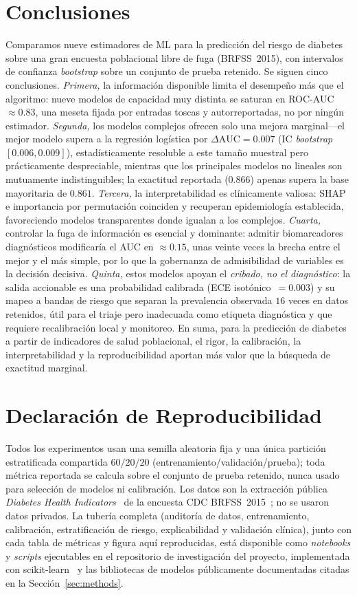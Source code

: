 \documentclass[conference]{IEEEtran}
\begin{document}
\section{Conclusiones}
Comparamos nueve estimadores de ML para la predicción del riesgo de
diabetes sobre una gran encuesta poblacional libre de fuga (BRFSS~2015), con intervalos de
confianza \emph{bootstrap} sobre un conjunto de prueba retenido. Se siguen cinco
conclusiones. \emph{Primera,} la información disponible limita el desempeño más que el
algoritmo: nueve modelos de capacidad muy distinta se saturan en ROC-AUC~$\approx0.83$, una
meseta fijada por entradas toscas y autorreportadas, no por ningún estimador. \emph{Segunda,}
los modelos complejos ofrecen solo una mejora marginal---el mejor modelo supera a la
regresión logística por $\Delta\text{AUC}=0.007$ (IC \emph{bootstrap} $[0.006,0.009]$),
estadísticamente resoluble a este tamaño muestral pero prácticamente despreciable, mientras
que los principales modelos no lineales son mutuamente indistinguibles; la exactitud
reportada ($0.866$) apenas supera la base mayoritaria de $0.861$. \emph{Tercera,} la
interpretabilidad es clínicamente valiosa: SHAP e importancia por permutación coinciden y
recuperan epidemiología establecida, favoreciendo modelos transparentes donde igualan a los
complejos. \emph{Cuarta,} controlar la fuga de información es esencial y dominante: admitir
biomarcadores diagnósticos modificaría el AUC en $\approx0.15$, unas veinte veces la brecha
entre el mejor y el más simple, por lo que la gobernanza de admisibilidad de variables es la
decisión decisiva. \emph{Quinta,} estos modelos apoyan el \emph{cribado, no el diagnóstico}:
la salida accionable es una probabilidad calibrada (ECE isotónico~$=0.003$) y su mapeo a
bandas de riesgo que separan la prevalencia observada $16$ veces en datos retenidos, útil
para el triaje pero inadecuada como etiqueta diagnóstica y que requiere recalibración local y
monitoreo. En suma, para la predicción de diabetes a partir de indicadores de salud
poblacional, el rigor, la calibración, la interpretabilidad y la reproducibilidad aportan más
valor que la búsqueda de exactitud marginal.

\section*{Declaración de Reproducibilidad}
Todos los experimentos usan una semilla aleatoria fija y una única partición estratificada
compartida $60/20/20$ (entrenamiento/validación/prueba); toda métrica reportada se calcula
sobre el conjunto de prueba retenido, nunca usado para selección de modelos ni calibración.
Los datos son la extracción pública \emph{Diabetes Health
Indicators}~\cite{teboul2021dataset} de la encuesta CDC BRFSS~2015~\cite{cdc2015brfss}; no
se usaron datos privados. La tubería completa (auditoría de datos, entrenamiento,
calibración, estratificación de riesgo, explicabilidad y validación clínica), junto con cada
tabla de métricas y figura aquí reproducidas, está disponible como \emph{notebooks} y
\emph{scripts} ejecutables en el repositorio de investigación del proyecto, implementada con
scikit-learn~\cite{pedregosa2011scikit} y las bibliotecas de modelos públicamente
documentadas citadas en la Sección~\ref{sec:methods}.



\end{document}
